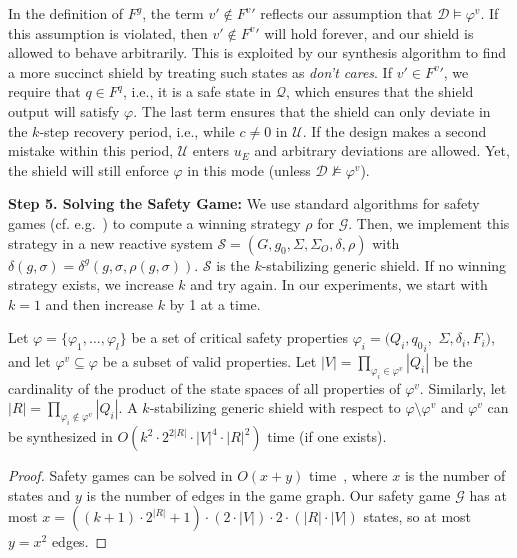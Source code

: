 \documentclass{llncs}
\newcommand{\design}{\mathcal{D}}
\newcommand{\shield}{\mathcal{S}}
\newcommand{\states}{Q}
\newcommand{\init}{q_0}
\newcommand{\doutalph}{\Sigma_O}
\newcommand{\dalph}{\Sigma}
\newcommand{\dletter}{\sigma}
\newcommand{\spec}{\varphi}
\newcommand{\specv}{\varphi^v}
\begin{document}
In the definition of $F^g$, the term $v' \not\in {F^v}'$ reflects our 
assumption that $\design \models \specv$.  If this assumption is 
violated, then $v' \not\in {F^v}'$ will hold forever, and our shield is 
allowed to behave arbitrarily.  This is exploited by our synthesis 
algorithm to find a more succinct shield  by treating such states as 
\emph{don't cares}.  If $v' \in {F^v}'$, we require that $q \in F^q$, 
i.e., it is a safe state in $\mathcal{Q}$, which ensures that the shield 
output will satisfy $\spec$. The last term ensures that the shield can 
only deviate in the $k$-step recovery period, i.e., while $c\neq 0$ in 
$\mathcal{U}$.  If the design makes a second mistake within this period, 
$\mathcal{U}$ enters $u_E$ and arbitrary deviations are allowed.  Yet, 
the shield will still enforce $\spec$ in this mode (unless $\design 
\not\models \specv$).

\noindent
\textbf{Step 5. Solving the Safety Game:}  
We use standard algorithms for safety games (cf.  e.g.~\cite{Mazala01}) 
to compute a winning strategy $\rho$ for $\mathcal{G}$.  Then, we 
implement this strategy in a new reactive system $\shield = (G, g_0, 
\dalph, \doutalph, \delta, \rho)$ with $\delta(g, \dletter) = 
\delta^g(g, \dletter,\rho(g,\dletter))$. $\shield$ is the 
$k$-stabilizing generic shield.  If no winning strategy exists, we 
increase $k$ and try again.  In our experiments, we start with $k=1$ and 
then increase $k$ by 1 at a time.

\begin{theorem}
Let $\spec = \{\spec_1,\ldots,\spec_l\}$ be a set of critical safety 
properties $\spec_i = (\states_i, {\init}_i, $ $\dalph, \delta_i, 
F_i)$, and let $\specv \subseteq \spec$ be a subset of valid properties. 
 Let $|V| = \prod_{\spec_i \in \specv} |\states_i|$ be the cardinality 
of the product of the state spaces of all properties of $\specv$. 
Similarly, let $|R| = \prod_{\spec_i \not\in \specv} |\states_i|$. A 
$k$-stabilizing generic shield with respect to $\spec \setminus \specv$ 
and $\specv$ can be synthesized in $O(k^2 \cdot 2^{2|R|} \cdot |V|^4 
\cdot |R|^2)$ time
(if one exists).
\end{theorem}
\begin{proof}
Safety games can be solved in $O(x + y)$ time~\cite{Mazala01}, where $x$ 
is the number of states and $y$ is the number of edges in the game 
graph.  Our safety game $\mathcal{G}$ has at most $x = ((k+1) \cdot 
2^{|R|} + 1) \cdot (2 \cdot |V|) \cdot 2 \cdot (|R| \cdot |V|)$ states, 
so at most $y = x^2$ edges. 
\end{proof}
\end{document}

